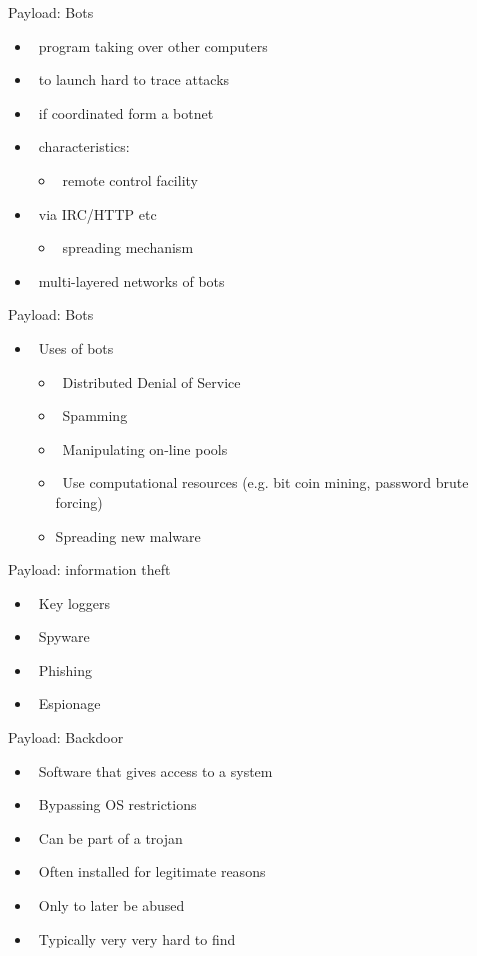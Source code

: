 \documentclass{beamer}
\begin{document}
\begin{frame}{Payload: Bots}
  \begin{itemize}
  \item  program taking over other computers 
  \item  to launch hard to trace attacks 
  \item  if coordinated form a botnet 
  \item  characteristics: 
    \begin{itemize}
    \item  remote control facility 
    \end{itemize}
  \item  via IRC/HTTP etc 
    \begin{itemize}
    \item  spreading mechanism 
    \end{itemize}
  \item  multi-layered networks of bots
  \end{itemize} 
\end{frame}

\begin{frame}{Payload: Bots}
  \begin{itemize}
  \item  Uses of bots
  \begin{itemize}
  \item  Distributed Denial of Service
  \item  Spamming
  \item  Manipulating on-line pools
  \item  Use computational resources (e.g. bit coin mining, password
    brute forcing)
  \item Spreading new malware
  \end{itemize}
  \end{itemize}
\end{frame}

\begin{frame}{Payload: information theft}
  \begin{itemize}
  \item  Key loggers
  \item  Spyware
  \item  Phishing
  \item  Espionage
  \end{itemize}
\end{frame}

\begin{frame}{Payload: Backdoor}
  \begin{itemize}
  \item  Software that gives access to a system 
  \item  Bypassing OS restrictions 
  \item  Can be part of a trojan 
  \item  Often installed for legitimate reasons 
  \item  Only to later be abused 
  \item  Typically very very hard to find
  \end{itemize}
\end{frame}
\end{document}

